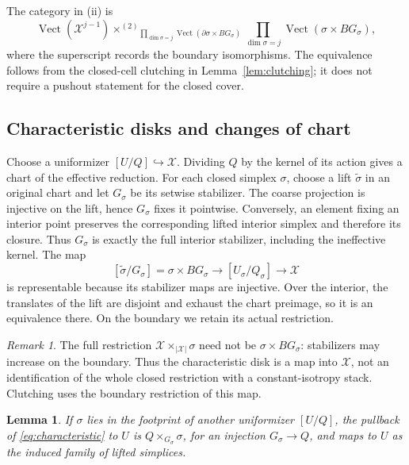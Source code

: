 \documentclass[11pt,a4paper,reqno]{amsart}
\numberwithin{equation}{section}
\newtheorem{lemma}[theorem]{Lemma}
\theoremstyle{remark}
\newtheorem{remark}[theorem]{Remark}
\theoremstyle{plain}
\newcommand{\X}{\mathcal X}
\newcommand{\Vect}{\operatorname{Vect}}
\begin{document}
The category in (ii) is
\begin{equation}\label{eq:gluing}
 \Vect(\X^{j-1})
 \mathbin{\times^{(2)}}_{\prod_{\dim\sigma=j}
       \Vect(\partial\sigma\times BG_\sigma)}
 \prod_{\dim\sigma=j}\Vect(\sigma\times BG_\sigma),
\end{equation}
where the superscript records the boundary isomorphisms. The equivalence
follows from the closed-cell clutching in Lemma~\ref{lem:clutching}; it does
not require a pushout statement for the closed cover.

\subsection{Characteristic disks and changes of chart}

Choose a uniformizer $[U/Q]\hookrightarrow\X$. Dividing $Q$ by the kernel of
its action gives a chart of the effective reduction. For each closed simplex
$\sigma$, choose a lift $\widetilde\sigma$ in an original chart and let
$G_\sigma$ be its setwise stabilizer. The coarse projection is injective on
the lift, hence $G_\sigma$ fixes it pointwise. Conversely, an element fixing
an interior point preserves the corresponding lifted interior simplex and
therefore its closure. Thus $G_\sigma$ is exactly the full interior
stabilizer, including the ineffective kernel. The map
\begin{equation}\label{eq:characteristic}
 [\widetilde\sigma/G_\sigma]=\sigma\times BG_\sigma
 \longrightarrow[U_\sigma/Q_\sigma]\longrightarrow\X
\end{equation}
is representable because its stabilizer maps are injective. Over the
interior, the translates of the lift are disjoint and exhaust the chart
preimage, so it is an equivalence there. On the boundary we retain its actual
restriction.

\begin{remark}\label{rem:boundary}
The full restriction $\X\mathbin{\times}_{|\X|}\sigma$ need not be
$\sigma\times BG_\sigma$: stabilizers may increase on the boundary. Thus
the characteristic disk is a map into $\X$, not an identification of the
whole closed restriction with a constant-isotropy stack. Clutching uses the boundary restriction of this map.
\end{remark}

\begin{lemma}\label{lem:chart}
If $\sigma$ lies in the footprint of another uniformizer $[U/Q]$, the
pullback of \eqref{eq:characteristic} to $U$ is
$Q\times_{G_\sigma}\sigma$, for an injection $G_\sigma\to Q$, and maps to
$U$ as the induced family of lifted simplices.
\end{lemma}
\end{document}
